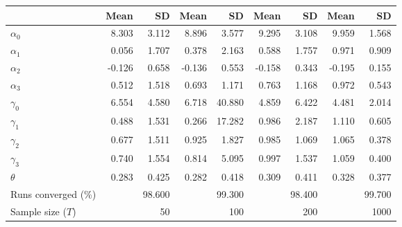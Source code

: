 
\begin{tabular}[t]{lrrrrrrrr}
\toprule
  & Mean & SD & Mean  & SD  & Mean   & SD   & Mean    & SD   \\
\midrule
$\alpha_{0}$ & 8.303 & 3.112 & 8.896 & 3.577 & 9.295 & 3.108 & 9.959 & 1.568\\
$\alpha_{1}$ & 0.056 & 1.707 & 0.378 & 2.163 & 0.588 & 1.757 & 0.971 & 0.909\\
$\alpha_{2}$ & -0.126 & 0.658 & -0.136 & 0.553 & -0.158 & 0.343 & -0.195 & 0.155\\
$\alpha_{3}$ & 0.512 & 1.518 & 0.693 & 1.171 & 0.763 & 1.168 & 0.972 & 0.543\\
$\gamma_{0}$ & 6.554 & 4.580 & 6.718 & 40.880 & 4.859 & 6.422 & 4.481 & 2.014\\
$\gamma_{1}$ & 0.488 & 1.531 & 0.266 & 17.282 & 0.986 & 2.187 & 1.110 & 0.605\\
$\gamma_{2}$ & 0.677 & 1.511 & 0.925 & 1.827 & 0.985 & 1.069 & 1.065 & 0.378\\
$\gamma_{3}$ & 0.740 & 1.554 & 0.814 & 5.095 & 0.997 & 1.537 & 1.059 & 0.400\\
$\theta$ & 0.283 & 0.425 & 0.282 & 0.418 & 0.309 & 0.411 & 0.328 & 0.377\\
Runs converged (\%) &  & 98.600 &  & 99.300 &  & 98.400 &  & 99.700\\
Sample size ($T$) &  & 50 &  & 100 &  & 200 &  & 1000\\
\bottomrule
\end{tabular}
